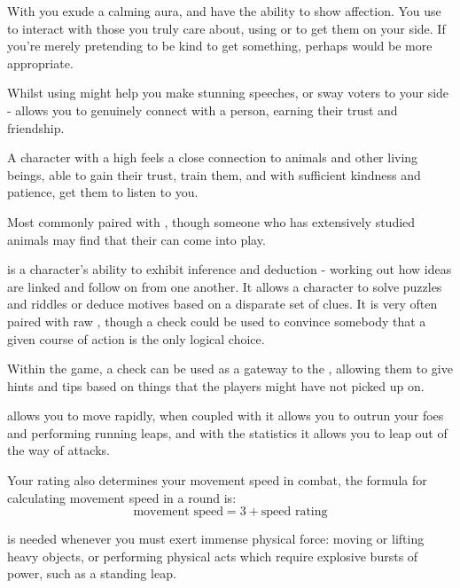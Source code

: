
With  you exude a calming aura, and have the ability to show affection. You use  to interact with those you truly care about, using  or  to get them on your side. If you're merely pretending to be kind to get something, perhaps  would be more appropriate. 

Whilst using  might help you make stunning speeches, or sway voters to your side -  allows you to genuinely connect with a person, earning their trust and friendship.


A character with a high  feels a close connection to animals and other living beings, able to gain their trust, train them, and with sufficient kindness and patience, get them to listen to you. 

Most commonly paired with , though someone who has extensively studied animals may find that their  can come into play. 



 is a character's ability to exhibit inference and deduction - working out how ideas are linked and follow on from one another. It allows a character to solve puzzles and riddles or deduce motives based on a disparate set of clues. It is very often paired with raw , though a  check could be used to convince somebody that a given course of action is the only logical choice. 

Within the game, a  check can be used as a gateway to the , allowing them to give hints and tips based on things that the players might have not picked up on.


 allows you to move rapidly, when coupled with  it allows you to outrun your foes and performing running leaps, and with the  statistics it allows you to leap out of the way of attacks. 

Your  rating also determines your movement speed in combat, the formula for calculating movement speed in a round is:
$$ \text{movement speed} = 3 + \text{speed rating} $$



 is needed whenever you must exert immense physical force: moving or lifting heavy objects, or performing physical acts which require explosive bursts of power, such as a standing leap. 

